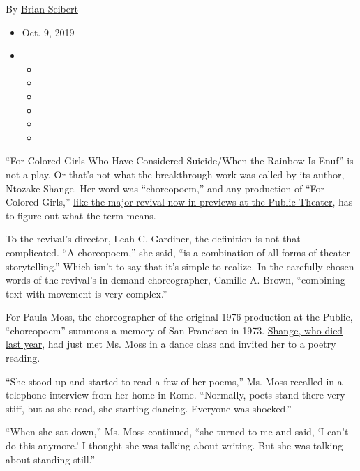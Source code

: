 By \href{https://www.nytimes3xbfgragh.onion/by/brian-seibert}{Brian
Seibert}

\begin{itemize}
\item
  Oct. 9, 2019
\item
  \begin{itemize}
  \item
  \item
  \item
  \item
  \item
  \item
  \end{itemize}
\end{itemize}

``For Colored Girls Who Have Considered Suicide/When the Rainbow Is
Enuf'' is not a play. Or that's not what the breakthrough work was
called by its author, Ntozake Shange. Her word was ``choreopoem,'' and
any production of ``For Colored Girls,''
\href{https://www.nytimes3xbfgragh.onion/2019/09/13/theater/for-colored-girls-returns-as-a-celebration-and-as-a-weapon.html?searchResultPosition=1}{like
the major revival now in previews at the Public Theater}, has to figure
out what the term means.

To the revival's director, Leah C. Gardiner, the definition is not that
complicated. ``A choreopoem,'' she said, ``is a combination of all forms
of theater storytelling.'' Which isn't to say that it's simple to
realize. In the carefully chosen words of the revival's in-demand
choreographer, Camille A. Brown, ``combining text with movement is very
complex.''

For Paula Moss, the choreographer of the original 1976 production at the
Public, ``choreopoem'' summons a memory of San Francisco in 1973.
\href{https://www.nytimes3xbfgragh.onion/2018/10/28/obituaries/ntozake-shange-is-dead-at-70.html}{Shange}\href{https://www.nytimes3xbfgragh.onion/2018/10/28/obituaries/ntozake-shange-is-dead-at-70.html}{,
who died last year,} had just met Ms. Moss in a dance class and invited
her to a poetry reading.

``She stood up and started to read a few of her poems,'' Ms. Moss
recalled in a telephone interview from her home in Rome. ``Normally,
poets stand there very stiff, but as she read, she starting dancing.
Everyone was shocked.''

``When she sat down,'' Ms. Moss continued, ``she turned to me and said,
`I can't do this anymore.' I thought she was talking about writing. But
she was talking about standing still.''

